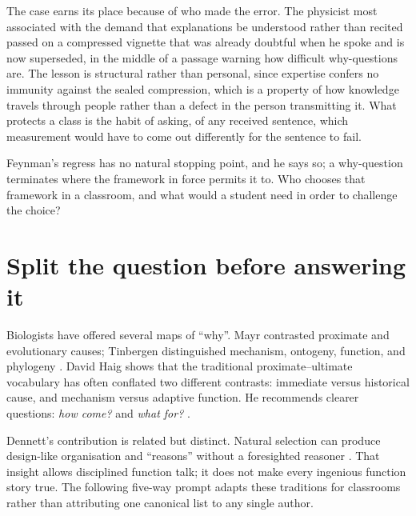 The case earns its place because of who made the error. The physicist most associated with the demand that explanations be understood rather than recited passed on a compressed vignette that was already doubtful when he spoke and is now superseded, in the middle of a passage warning how difficult why-questions are. The lesson is structural rather than personal, since expertise confers no immunity against the sealed compression, which is a property of how knowledge travels through people rather than a defect in the person transmitting it. What protects a class is the habit of asking, of any received sentence, which measurement would have to come out differently for the sentence to fail.

\begin{openquestion}
Feynman's regress has no natural stopping point, and he says so; a why-question terminates where the framework in force permits it to. Who chooses that framework in a classroom, and what would a student need in order to challenge the choice?
\end{openquestion}

\section{Split the question before answering it}

Biologists have offered several maps of ``why''. Mayr contrasted proximate and evolutionary causes; Tinbergen distinguished mechanism, ontogeny, function, and phylogeny \citep{mayr1961,tinbergen1963}. David Haig shows that the traditional proximate--ultimate vocabulary has often conflated two different contrasts: immediate versus historical cause, and mechanism versus adaptive function. He recommends clearer questions: \emph{how come?} and \emph{what for?} \citep{haig2013}.

Dennett's contribution is related but distinct. Natural selection can produce design-like organisation and ``reasons'' without a foresighted reasoner \citep{dennett1995}. That insight allows disciplined function talk; it does not make every ingenious function story true. The following five-way prompt adapts these traditions for classrooms rather than attributing one canonical list to any single author.

